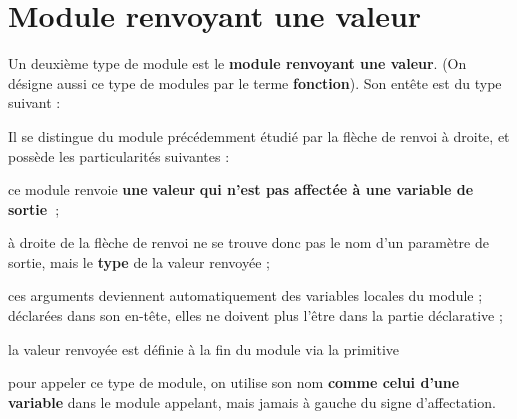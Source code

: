 \section{Module renvoyant une valeur}

	Un deuxième type de module est le 
	\textbf{module renvoyant une valeur}. 
	(On désigne aussi ce type de modules par le terme \textbf{fonction}).
	Son entête est du type suivant :


	Il se distingue du module précédemment étudié par la flèche de renvoi à
	droite, et possède les particularités suivantes :

	\begin{liste}
	\item {
		{ce module renvoie
		}{\textbf{une}}{
		}{\textbf{valeur}}{
		}{\textbf{qui n’est pas affectée à une variable
		de
		}}{\textbf{sortie~}}{;}}
	\item {
		{à droite de la flèche de renvoi ne se trouve
		donc pas le nom d’un paramètre de sortie, mais le
		}{\textbf{type}}{ de la
		valeur renvoyée ;}}
	\item {
		}
	\item {
		}
	\item {
		ces arguments deviennent automatiquement des variables locales du module
		; déclarées dans son en-tête, elles ne doivent plus l’être dans la
		partie déclarative ;}
	\item {
		{la valeur renvoyée est définie à la fin du
		module via la primitive
		}}
	\item {
		pour appeler ce type de module, on utilise son nom \textbf{comme celui
		d’une variable} dans le module appelant, mais jamais à gauche du signe
		d’affectation.}
	\end{liste}

